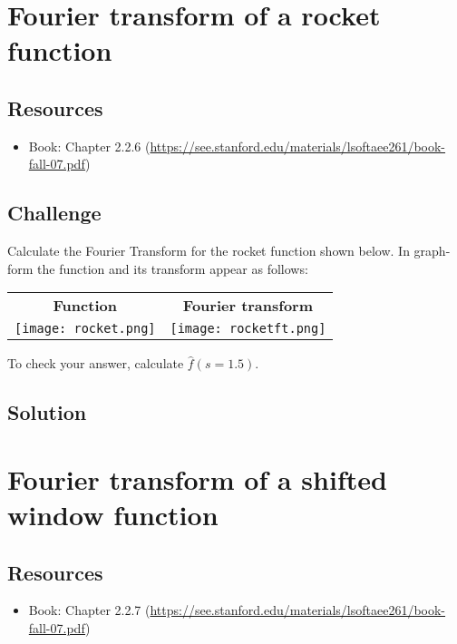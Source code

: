 \timebox




\newpage
\section{Fourier transform of a rocket function}

\subsection*{Resources}
\begin{itemize}
    \item Book: Chapter 2.2.6 (\url{https://see.stanford.edu/materials/lsoftaee261/book-fall-07.pdf})
\end{itemize}

\subsection*{Challenge}
Calculate the Fourier Transform for the rocket function shown below. In graph-form the function and its transform appear as follows:

\begin{tabular}{cc}
    \textbf{Function} & \textbf{Fourier transform} \\
    \texttt{[image: rocket.png]} & \texttt{[image: rocketft.png]}
\end{tabular}

To check your answer, calculate $\hat{f}(s=1.5)$.

\subsection*{Solution}

\timebox




\newpage
\section{Fourier transform of a shifted window function}

\subsection*{Resources}
\begin{itemize}
    \item Book: Chapter 2.2.7 (\url{https://see.stanford.edu/materials/lsoftaee261/book-fall-07.pdf})
\end{itemize}

